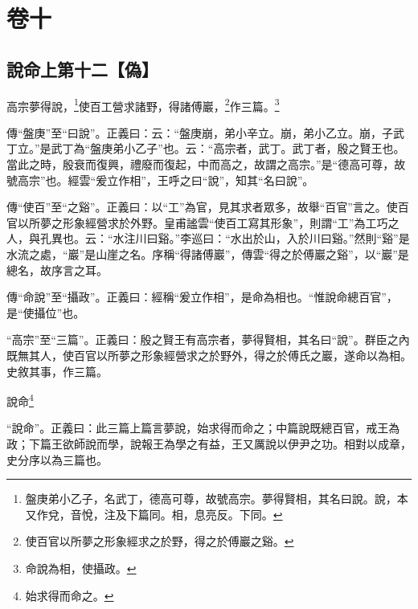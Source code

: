 

\chapter{卷十}


\section{說命上第十二【偽】}


高宗夢得說，\footnote{盤庚弟小乙子，名武丁，德高可尊，故號高宗。夢得賢相，其名曰說。說，本又作兌，音悅，注及下篇同。相，息亮反。下同。}使百工營求諸野，得諸傅巖，\footnote{使百官以所夢之形象經求之於野，得之於傅巖之谿。}作三篇。\footnote{命說為相，使攝政。}


{\noindent\zhuan{}\fzbyks 傳“盤庚”至“曰說”。正義曰：云：“盤庚崩，弟小辛立。崩，弟小乙立。崩，子武丁立。”是武丁為“盤庚弟小乙子”也。云：“高宗者，武丁。武丁者，殷之賢王也。當此之時，殷衰而復興，禮廢而復起，中而高之，故謂之高宗。”是“德高可尊，故號高宗”也。經雲“爰立作相”，王呼之曰“說”，知其“名曰說”。 \par}

{\noindent\zhuan{}\fzbyks 傳“使百”至“之谿”。正義曰：以“工”為官，見其求者眾多，故舉“百官”言之。使百官以所夢之形象經營求於外野。皇甫謐雲“使百工寫其形象”，則謂“工”為工巧之人，與孔異也。云：“水注川曰谿。”李巡曰：“水出於山，入於川曰谿。”然則“谿”是水流之處，“巖”是山崖之名。序稱“得諸傅巖”，傳雲“得之於傅巖之谿”，以“巖”是總名，故序言之耳。 \par}

{\noindent\zhuan{}\fzbyks 傳“命說”至“攝政”。正義曰：經稱“爰立作相”，是命為相也。“惟說命總百官”，是“使攝位”也。 \par}

{\noindent\shu{}\fzkt “高宗”至“三篇”。正義曰：殷之賢王有高宗者，夢得賢相，其名曰“說”。群臣之內既無其人，使百官以所夢之形象經營求之於野外，得之於傅氏之巖，遂命以為相。史敘其事，作三篇。 \par}

說命\footnote{始求得而命之。}

{\noindent\shu{}\fzkt “說命”。正義曰：此三篇上篇言夢說，始求得而命之；中篇說既總百官，戒王為政；下篇王欲師說而學，說報王為學之有益，王又厲說以伊尹之功。相對以成章，史分序以為三篇也。 \par}

